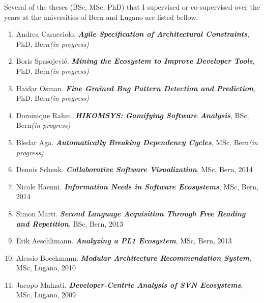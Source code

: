 
\newcommand{\super}[5]{\item #1. \emph{\bf #2}, #3, #4#5}
\newcommand{\inprogr}{\emph{(in progress)}}
\newcommand{\yr}[1]{, #1}

Several of the theses (BSc, MSc, PhD) that I supervised or co-supervised over the years at the universities of Bern and Lugano are listed bellow. 

\begin{enumerate}

\super 
	{Andrea Caracciolo}
	{Agile Specification of Architectural Constraints}
	{PhD}
	{Bern}
	{\inprogr}

\super 
	{Boris Spasojevi\'{c}}
	{Mining the Ecosystem to Improve Developer Tools}
	{PhD}
	{Bern}
	{\inprogr}

\super 
	{Haidar Osman}
	{Fine Grained Bug Pattern Detection and Prediction}
	{PhD}
	{Bern}
	{\inprogr}	


\super 
	{Dominique Rahm}
	{HIKOMSYS: Gamifying Software Analysis}
	{BSc}
	{Bern}
	{\inprogr}

\super 
	{Bledar Aga}
	{Automatically Breaking Dependency Cycles}
	{MSc}
	{Bern}
	{\inprogr}

\super 
	{Dennis Schenk}
	{Collaborative Software Visualization}
	{MSc}
	{Bern}
	{\yr{2014}}

\super 
	{Nicole Haenni}
	{Information Needs in Software Ecosystems}
	{MSc}
	{Bern}
	{\yr{2014}}

\super 
	{Simon Marti}
	{Second Language Acquisition Through Free Reading and Repetition}
	{BSc}
	{Bern}
	{\yr{2013}}

\super 
	{Erik Aeschlimann}
	{Analyzing a PL1 Ecosystem}
	{MSc}
	{Bern}
	{\yr{2013}}


\super 
	{Alessio Boeckmann}
	{Modular Architecture Recommendation System}
	{MSc}
	{Lugano}
	{\yr{2010}}

\super 
	{Jacopo Malnati}
	{Developer-Centric Analysis of SVN Ecosystems}
	{MSc}
	{Lugano}
	{\yr{2009}}



\end{enumerate}